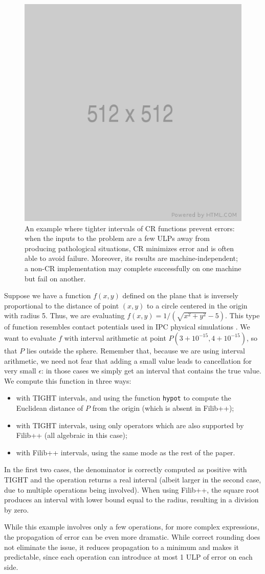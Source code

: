 \begin{figure}
	\includegraphics[width=0.4\linewidth]{fig/512x512.png}
	\centering
	\caption{An example where tighter intervals of CR functions prevent errors: when the inputs to the problem are a few ULPs away from producing pathological situations, CR minimizes error and is often able to avoid failure. Moreover, its results are machine-independent; a non-CR implementation may complete successfully on one machine but fail on another.}
	\label{fig:tori}
\end{figure}
Suppose we have a function $f(x,y)$ defined on the plane that is inversely proportional to the distance of point $(x,y)$ to a circle centered in the origin with radius 5.
Thus, we are evaluating $f(x,y) = 1/(\sqrt{x^2 + y^2}-5)$.
This type of function resembles contact potentials used in IPC physical simulations \cite{Li2020IPC}.
We want to evaluate $f$ with interval arithmetic at point $P(3+10^{-15},4+10^{-15})$, so that $P$ lies outside the sphere. Remember that, because we are using interval arithmetic, we need not fear that adding a small value leads to cancellation for very small $\epsilon$: in those cases we simply get an interval that contains the true value.
We compute this function in three ways:
\begin{itemize}
	\item with TIGHT intervals, and using the function \texttt{hypot} to compute the Euclidean distance of $P$ from the origin (which is absent in Filib++);
	\item with TIGHT intervals, using only operators which are also supported by Filib++ (all algebraic in this case);
	\item with Filib++ intervals, using the same mode as the rest of the paper.
\end{itemize}
In the first two cases, the denominator is correctly computed as positive with TIGHT and the operation returns a real interval (albeit larger in the second case, due to multiple operations being involved).
When using Filib++, the square root produces an interval with lower bound equal to the radius, resulting in a division by zero.

While this example involves only a few operations, for more complex expressions, the propagation of error can be even more dramatic. 
While correct rounding does not eliminate the issue, it reduces propagation to a minimum and makes it predictable, since each operation can introduce at most 1 ULP of error on each side.

%
